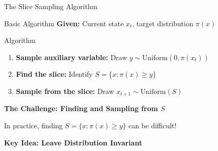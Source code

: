 \documentclass[aspectratio=169]{beamer}
\begin{document}
\begin{frame}{The Slice Sampling Algorithm}

	\begin{block}{Basic Algorithm}
		\textbf{Given:} Current state $x_t$, target distribution $\pi(x)$
	\end{block}

	\begin{block}{Algorithm}
		\begin{enumerate}
			\item \textbf{Sample auxiliary variable:} Draw $y \sim \text{Uniform}(0, \pi(x_t))$
			\item  \textbf{Find the slice:} Identify $S = \{x : \pi(x) \geq y\}$
			\item  \textbf{Sample from the slice:} Draw $x_{t+1} \sim \text{Uniform}(S)$
		\end{enumerate}
	\end{block}

	\vspace{0.3cm}
	\textbf{The Challenge: Finding and Sampling from $S$}

	In practice, finding $S = \{x : \pi(x) \geq y\}$ can be difficult!

	\textbf{Key Idea: Leave Distribution Invariant}
\end{frame}
\end{document}
